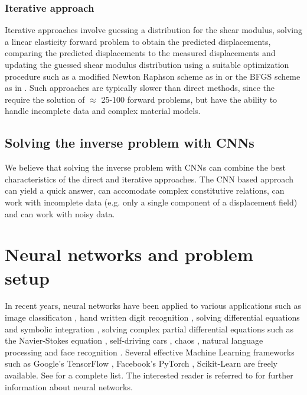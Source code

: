 \documentclass[12pt]{article}
\begin{document}
\subsubsection{Iterative approach} Iterative approaches \cite{paper:oberai2003,paper:gokhale2008,paper:kalle1996,paper:doyley,paper:goenezen2011} involve guessing a distribution for the shear modulus, solving a linear elasticity forward problem to obtain the predicted displacements, comparing the predicted displacements to the measured displacements and updating the guessed shear modulus distribution using a suitable optimization procedure such as a modified Newton Raphson scheme as in \cite{paper:doyley} or the BFGS scheme as in \cite{paper:gokhale2008,paper:goenezen2011}. Such approaches are typically slower than direct methods, since the require the solution of $\approx$ 25-100 forward problems, but have the ability to handle incomplete data and complex material models.
\subsection{Solving the inverse problem with CNNs}
We believe that solving the inverse problem with CNNs can combine the best characteristics of the direct and iterative approaches. The CNN based approach can yield a quick answer, can accomodate complex constitutive relations, can work with incomplete data (e.g. only a single component of a displacement field) and can work with noisy data.
\section{Neural networks and problem setup}
In recent years, neural networks have been applied to various applications such as image classificaton \cite{paper:hinton2017}, hand written digit recognition \cite{paper:kulkarni2018}, solving differential equations and symbolic integration \cite{misc:lample2019}, solving complex partial differential equations such as the Navier-Stokes equation \cite{misc:anandkumar2020}, self-driving cars \cite{misc:agnihotri2019,misc:nvidiaselfdriving2016}, chaos \cite{paper:pathak2018}, natural language processing \cite{misc:googlenlp} and face recognition \cite{conf:taigman2014}. Several effective Machine Learning frameworks such as Google's TensorFlow \cite{misc:tensorflow}, Facebook's PyTorch \cite{incollect:pytorch}, Scikit-Learn \cite{paper:scikit-learn} are freely available. See \cite{misc:compdeep} for a complete list. The interested reader is referred to \cite{book:aggarwal,book:goodfellow,book:chollet,misc:cs231n,misc:andrewng,misc:udemy} for further information about neural networks.
\end{document}

